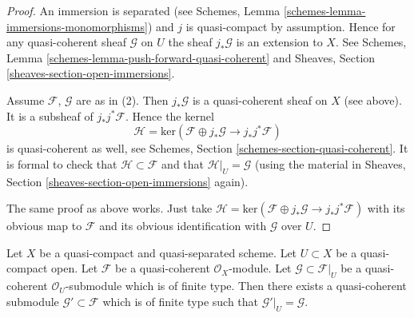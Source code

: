 \begin{proof}
An immersion is separated
(see Schemes, Lemma \ref{schemes-lemma-immersions-monomorphisms})
and $j$ is quasi-compact by assumption.
Hence for any quasi-coherent sheaf $\mathcal{G}$ on $U$ the sheaf
$j_*\mathcal{G}$ is an extension to $X$. See
Schemes, Lemma \ref{schemes-lemma-push-forward-quasi-coherent} and
Sheaves, Section \ref{sheaves-section-open-immersions}.

\medskip\noindent
Assume $\mathcal{F}$, $\mathcal{G}$ are as in (2).
Then $j_*\mathcal{G}$ is a quasi-coherent sheaf on $X$ (see above).
It is a subsheaf of $j_*j^*\mathcal{F}$.
Hence the kernel
$$
\mathcal{H} =
\text{ker}(\mathcal{F} \oplus j_* \mathcal{G}
\longrightarrow j_*j^*\mathcal{F})
$$
is quasi-coherent as well, see
Schemes, Section \ref{schemes-section-quasi-coherent}.
It is formal to check that $\mathcal{H} \subset \mathcal{F}$ and that
$\mathcal{H}|_U = \mathcal{G}$ (using the material in
Sheaves, Section \ref{sheaves-section-open-immersions} again).

\medskip\noindent
The same proof as above works. Just take
$\mathcal{H} = \text{ker}(\mathcal{F} \oplus j_* \mathcal{G}
\to j_*j^*\mathcal{F})$ with its obvious map to $\mathcal{F}$
and its obvious identification with $\mathcal{G}$ over $U$.
\end{proof}

\begin{lemma}
\label{lemma-extend}
Let $X$ be a quasi-compact and quasi-separated scheme.
Let $U \subset X$ be a quasi-compact open.
Let $\mathcal{F}$ be a quasi-coherent $\mathcal{O}_X$-module.
Let $\mathcal{G} \subset \mathcal{F}|_U$ be a quasi-coherent
$\mathcal{O}_U$-submodule which is of finite type. Then
there exists a quasi-coherent submodule $\mathcal{G}' \subset \mathcal{F}$
which is of finite type such that $\mathcal{G}'|_U = \mathcal{G}$.
\end{lemma}

